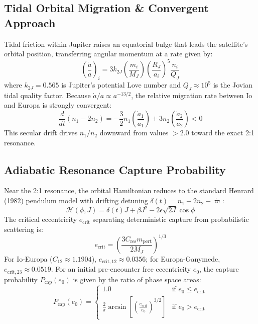 \documentclass[11pt,a4paper]{article}
\begin{document}
\subsection{Tidal Orbital Migration \& Convergent Approach}
Tidal friction within Jupiter raises an equatorial bulge that leads the satellite's orbital position, transferring angular momentum at a rate given by:
\begin{equation}
\left( \frac{\dot{a}}{a} \right)_i = 3 k_{2J} \left( \frac{m_i}{M_J} \right) \left( \frac{R_J}{a_i} \right)^5 \frac{n_i}{Q_J}
\end{equation}
where $k_{2J} = 0.565$ is Jupiter's potential Love number and $Q_J \approx 10^5$ is the Jovian tidal quality factor. Because $\dot{a}/a \propto a^{-13/2}$, the relative migration rate between Io and Europa is strongly convergent:
\begin{equation}
\frac{d}{dt}(n_1 - 2n_2) = -\frac{3}{2} n_1 \left(\frac{\dot{a}_1}{a_1}\right) + 3 n_2 \left(\frac{\dot{a}_2}{a_2}\right) < 0
\end{equation}
This secular drift drives $n_1/n_2$ downward from values $> 2.0$ toward the exact 2:1 resonance.

\subsection{Adiabatic Resonance Capture Probability}
Near the 2:1 resonance, the orbital Hamiltonian reduces to the standard Henrard (1982) pendulum model with drifting detuning $\delta(t) = n_1 - 2n_2 - \dot{\varpi}$:
\begin{equation}
\mathcal{H}(\phi, J) = \delta(t) J + \beta J^2 - 2\epsilon \sqrt{2J} \cos\phi
\end{equation}
The critical eccentricity $e_{\mathrm{crit}}$ separating deterministic capture from probabilistic scattering is:
\begin{equation}
e_{\mathrm{crit}} = \left( \frac{3 C_{\mathrm{res}} m_{\mathrm{pert}}}{2 M_J} \right)^{1/3}
\end{equation}
For Io-Europa ($C_{12} \approx 1.1904$), $e_{\mathrm{crit},12} \approx 0.0356$; for Europa-Ganymede, $e_{\mathrm{crit},23} \approx 0.0519$. For an initial pre-encounter free eccentricity $e_0$, the capture probability $P_{\mathrm{cap}}(e_0)$ is given by the ratio of phase space areas:
\begin{equation}
P_{\mathrm{cap}}(e_0) = \begin{cases}
1.0 & \text{if } e_0 \le e_{\mathrm{crit}} \\
\displaystyle \frac{2}{\pi} \arcsin\left[ \left( \frac{e_{\mathrm{crit}}}{e_0} \right)^{3/2} \right] & \text{if } e_0 > e_{\mathrm{crit}}
\end{cases}
\end{equation}
\end{document}
